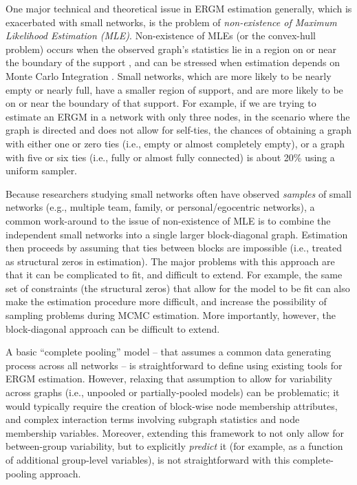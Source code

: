 \documentclass[review, nonatbib,doubleblind]{elsarticle/elsarticle}
\begin{document}
One major technical and theoretical issue in ERGM estimation generally, which is exacerbated with small networks, is the problem of \textit{non-existence of Maximum Likelihood Estimation (MLE)}. Non-existence of MLEs (or the convex-hull problem) occurs when the observed graph's statistics lie in a region on or near the boundary of the support \cite{Barndorff-Nielsen2014}, and can be stressed when estimation depends on Monte Carlo Integration \cite{Handcock2003}. Small networks, which are more likely to be nearly empty or nearly full, have a smaller region of support, and are more likely to be on or near the boundary of that support. For example, if we are trying to estimate an ERGM in a network with only three nodes, in the scenario where the graph is directed and does not allow for self-ties, the chances of obtaining a graph with either one or zero ties (i.e., empty or almost completely empty), or a graph with five or six ties (i.e., fully or almost fully connected) is about 20\% using a uniform sampler.

Because researchers studying small networks often have observed \textit{samples} of small networks (e.g., multiple team, family, or personal/egocentric networks), a common work-around to the issue of non-existence of MLE is to combine the independent small networks into a single larger block-diagonal graph. Estimation then proceeds by assuming that ties between blocks are impossible (i.e., treated as structural zeros in estimation). The major problems with this approach are that it can be complicated to fit, and difficult to extend. For example, the same set of constraints (the structural zeros) that allow for the model to be fit can also make the estimation procedure more difficult, and increase the possibility of sampling problems during MCMC estimation. More importantly, however, the block-diagonal approach can be difficult to extend. 

A basic ``complete pooling'' model -- that assumes a common data generating process across all networks -- is straightforward to define using existing tools for ERGM estimation. However, relaxing that assumption to allow for variability across graphs (i.e., unpooled or partially-pooled models) can be problematic; it would typically require the creation of block-wise node membership attributes, and complex interaction terms involving subgraph statistics and node membership variables. Moreover, extending this framework to not only  allow for between-group variability, but to explicitly  \textit{predict} it (for example, as a function of additional group-level variables), is not straightforward with this complete-pooling approach.
\end{document}
